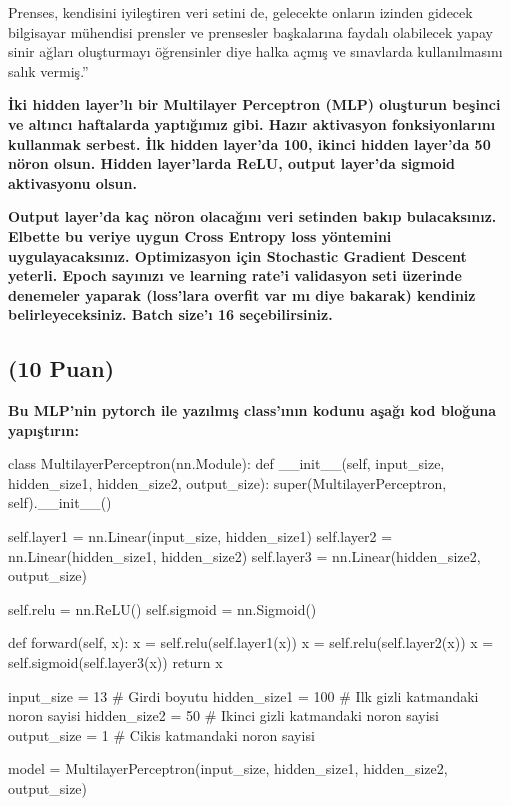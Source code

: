\documentclass[11pt]{article}
\begin{document}
Prenses, kendisini iyileştiren veri setini de, gelecekte onların izinden gidecek bilgisayar mühendisi prensler ve prensesler başkalarına faydalı olabilecek yapay sinir ağları oluşturmayı öğrensinler diye halka açmış ve sınavlarda kullanılmasını salık vermiş.''

\textbf{İki hidden layer'lı bir Multilayer Perceptron (MLP) oluşturun beşinci ve altıncı haftalarda yaptığımız gibi. Hazır aktivasyon fonksiyonlarını kullanmak serbest. İlk hidden layer'da 100, ikinci hidden layer'da 50 nöron olsun. Hidden layer'larda ReLU, output layer'da sigmoid aktivasyonu olsun.}

\textbf{Output layer'da kaç nöron olacağını veri setinden bakıp bulacaksınız. Elbette bu veriye uygun Cross Entropy loss yöntemini uygulayacaksınız. Optimizasyon için Stochastic Gradient Descent yeterli. Epoch sayınızı ve learning rate'i validasyon seti üzerinde denemeler yaparak (loss'lara overfit var mı diye bakarak) kendiniz belirleyeceksiniz. Batch size'ı 16 seçebilirsiniz.}

\subsection{(10 Puan)} \textbf{Bu MLP'nin pytorch ile yazılmış class'ının kodunu aşağı kod bloğuna yapıştırın:}

\begin{python}

class MultilayerPerceptron(nn.Module):
    def __init__(self, input_size, hidden_size1, hidden_size2, output_size):
        super(MultilayerPerceptron, self).__init__()
        
        self.layer1 = nn.Linear(input_size, hidden_size1)
        self.layer2 = nn.Linear(hidden_size1, hidden_size2)
        self.layer3 = nn.Linear(hidden_size2, output_size)
        
        self.relu = nn.ReLU()
        self.sigmoid = nn.Sigmoid()

    def forward(self, x):
        x = self.relu(self.layer1(x))
        x = self.relu(self.layer2(x))
        x = self.sigmoid(self.layer3(x))
        return x
        
input_size = 13                 # Girdi boyutu
hidden_size1 = 100         # Ilk gizli katmandaki noron sayisi
hidden_size2 = 50           # Ikinci gizli katmandaki noron sayisi
output_size = 1                # Cikis katmandaki noron sayisi

model = MultilayerPerceptron(input_size, hidden_size1, hidden_size2, output_size)

        
\end{python}
\end{document}
